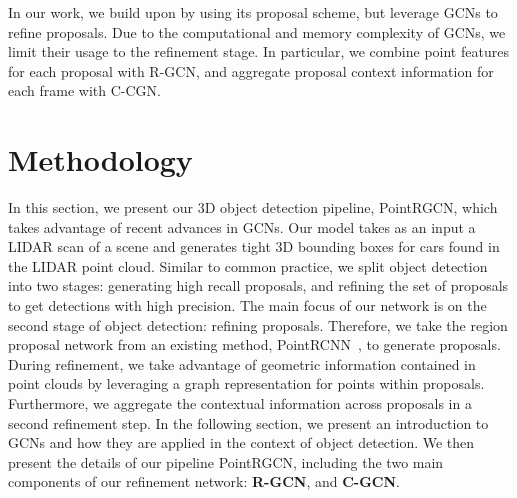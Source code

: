 \documentclass[10pt,twocolumn,letterpaper]{article}
\begin{document}
In our work, we build upon \PointRCNN by using its proposal scheme, but leverage GCNs to refine proposals.
Due to the computational and memory complexity of GCNs, we limit their usage to the refinement stage.
In particular, we combine point features for each proposal with R-GCN, and aggregate proposal context information for each frame with C-CGN.

 \section{Methodology}


In this section, we present our 3D object detection pipeline, PointRGCN, which takes advantage of recent advances in GCNs.
Our model takes as an input a LIDAR scan of a scene and generates tight 3D bounding boxes for cars found in the LIDAR point cloud.
Similar to common practice, we split object detection into two stages: generating high recall proposals, and refining the set of proposals to get detections with high precision.
The main focus of our network is on the second stage of object detection: refining proposals.
Therefore, we take the region proposal network from an existing method, PointRCNN~\cite{shi2019pointrcnn}, to generate proposals.
During refinement, we take advantage of geometric information contained in point clouds by leveraging a graph representation for points within proposals.
Furthermore, we aggregate the contextual information across proposals in a second refinement step.
In the following section, we present an introduction to GCNs and how they are applied in the context of object detection.
We then present the details of our pipeline PointRGCN, including the two main components of our refinement network: \textbf{R-GCN}, and \textbf{C-GCN}.
\end{document}
